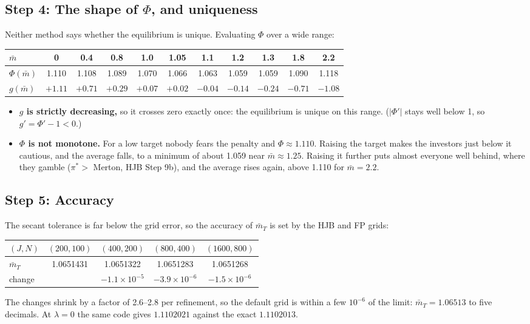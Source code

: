 \documentclass[11pt]{article}
\newcommand{\mb}{\bar m}
\begin{document}
\subsection*{Step 4: The shape of \texorpdfstring{$\Phi$}{Phi}, and uniqueness}
Neither method says whether the equilibrium is unique. Evaluating $\Phi$ over a wide range:
\begin{center}
\small
\begin{tabular}{@{}lcccccccccc@{}}
\toprule
$\mb$ & 0 & 0.4 & 0.8 & 1.0 & 1.05 & 1.1 & 1.2 & 1.3 & 1.8 & 2.2 \\
\midrule
$\Phi(\mb)$ & 1.110 & 1.108 & 1.089 & 1.070 & 1.066 & 1.063 & 1.059 & 1.059 & 1.090 & 1.118 \\
$g(\mb)$ & $+1.11$ & $+0.71$ & $+0.29$ & $+0.07$ & $+0.02$ & $-0.04$ & $-0.14$ & $-0.24$ &
  $-0.71$ & $-1.08$ \\
\bottomrule
\end{tabular}
\end{center}
\begin{itemize}
  \item \textbf{$g$ is strictly decreasing,} so it crosses zero exactly once: the equilibrium is
        unique on this range. ($|\Phi'|$ stays well below 1, so $g'=\Phi'-1<0$.)
  \item \textbf{$\Phi$ is not monotone.} For a low target nobody fears the penalty and
        $\Phi\approx1.110$. Raising the target makes the investors just below it cautious, and
        the average falls, to a minimum of about 1.059 near $\mb\approx1.25$. Raising it further
        puts almost everyone well behind, where they gamble ($\pi^*>$ Merton, HJB Step 9b), and
        the average rises again, above 1.110 for $\mb=2.2$.
\end{itemize}

\subsection*{Step 5: Accuracy}
The secant tolerance is far below the grid error, so the accuracy of $\mb_T$ is set by the HJB
and FP grids:
\begin{center}
\small
\begin{tabular}{@{}lcccc@{}}
\toprule
$(J,N)$ & $(200,100)$ & $(400,200)$ & $(800,400)$ & $(1600,800)$ \\
\midrule
$\mb_T$ & 1.0651431 & 1.0651322 & 1.0651283 & 1.0651268 \\
change & & $-1.1\times10^{-5}$ & $-3.9\times10^{-6}$ & $-1.5\times10^{-6}$ \\
\bottomrule
\end{tabular}
\end{center}
The changes shrink by a factor of 2.6--2.8 per refinement, so the default grid is within a few
$10^{-6}$ of the limit: $\mb_T=1.06513$ to five decimals. At $\lambda=0$ the same code gives
$1.1102021$ against the exact $1.1102013$.
\end{document}
